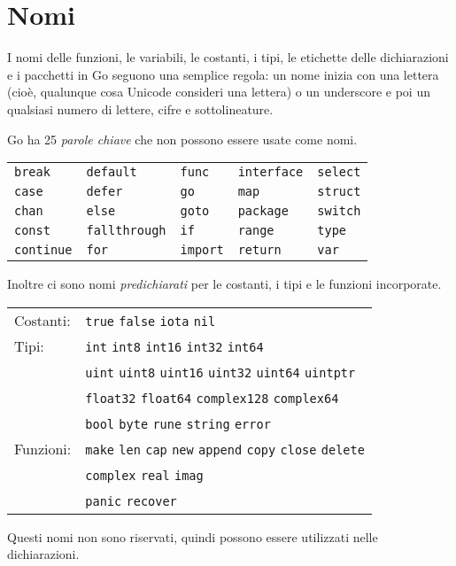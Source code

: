 \section{Nomi}
\label{sec:nomi}%
I nomi delle funzioni, le variabili, le costanti, i tipi, le etichette delle dichiarazioni e i pacchetti in Go seguono una semplice regola: un nome inizia con una lettera (cioè, qualunque cosa Unicode consideri una lettera) o un underscore e poi un qualsiasi numero di lettere, cifre e sottolineature.

Go ha 25 \textit{parole chiave} che non possono essere usate come nomi.
\begin{table}[H]
    \centering
    \begin{tabular}{ l l l l l }
        \verb|break|    & \verb|default|     & \verb|func|   & \verb|interface| & \verb|select| \\
        \verb|case|     & \verb|defer|       & \verb|go|     & \verb|map|       & \verb|struct| \\
        \verb|chan|     & \verb|else|        & \verb|goto|   & \verb|package|   & \verb|switch| \\
        \verb|const|    & \verb|fallthrough| & \verb|if|     & \verb|range|     & \verb|type|   \\
        \verb|continue| & \verb|for|         & \verb|import| & \verb|return|    & \verb|var|
    \end{tabular}
    \label{tab:table11}
\end{table}

Inoltre ci sono nomi \textit{predichiarati} per le costanti, i tipi e le funzioni incorporate.
\begin{table}[H]
    \centering
    \begin{tabular}{ l l }
        Costanti: & \verb|true| \verb|false| \verb|iota| \verb|nil|                                                   \\
        Tipi:     & \verb|int| \verb|int8| \verb|int16| \verb|int32| \verb|int64|                                     \\
        & \verb|uint| \verb|uint8| \verb|uint16| \verb|uint32| \verb|uint64| \verb|uintptr|                 \\
        & \verb|float32| \verb|float64| \verb|complex128| \verb|complex64|                                  \\
        & \verb|bool| \verb|byte| \verb|rune| \verb|string| \verb|error|                                    \\
        Funzioni: & \verb|make| \verb|len| \verb|cap| \verb|new| \verb|append| \verb|copy| \verb|close| \verb|delete| \\
        & \verb|complex| \verb|real| \verb|imag|                                                            \\
        & \verb|panic| \verb|recover|
    \end{tabular}
    \label{tab:table12}
\end{table}
Questi nomi non sono riservati, quindi possono essere utilizzati nelle dichiarazioni.

